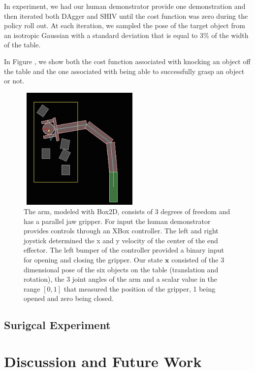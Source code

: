 \documentclass[10pt, conference]{ieeeconf}      %
\newcommand{\bx}{\mathbf{x}}
\begin{document}
In experiment, we had our human demonstrator provide one demonstration and then iterated both  DAgger and SHIV until the cost function was zero during the policy roll out. At each iteration, we sampled the pose of the target object from an isotropic Gaussian with a standard deviation that is equal to $3\%$ of the width of the table. 

In Figure , we show both the cost function associated with knocking an object off the table and the one associated with being able to successfully grasp an object or not. 


\begin{figure}[t!]
\centering
\includegraphics[width=6cm, height=6cm]{figures/box2D_arm.png}
\caption{  The arm, modeled with Box2D, consists of 3 degrees of freedom and has a parallel jaw gripper. For input the human demonstrator provides controls through an XBox controller. The left and right joystick determined the x and y velocity of the center of the end effector. The left bumper of the controller provided a binary input for opening and closing the gripper. Our state $\bx$ consisted of the 3 dimensional pose of the six objects on the table (translation and rotation), the 3 joint angles of the arm and a scalar value in the range $[0,1]$ that measured the position of the gripper, 1 being opened and zero being closed. }

\vspace*{-10pt}
\label{fig:box2D_arm.png}
\end{figure}



\subsection{Surigcal Experiment}



\section{Discussion and Future Work}




\end{document}
